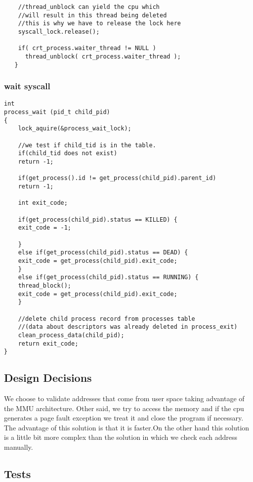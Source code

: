 {\begin{lstlisting}
    //thread_unblock can yield the cpu which
    //will result in this thread being deleted
    //this is why we have to release the lock here
    syscall_lock.release();
    
    if( crt_process.waiter_thread != NULL ) 
      thread_unblock( crt_process.waiter_thread );
   }
    \end{lstlisting}


    \subsubsection{wait syscall}
    \vspace{-1em} %
    \begin{lstlisting}
int
process_wait (pid_t child_pid) 
{
    lock_aquire(&process_wait_lock);
    
    //we test if child_tid is in the table.
    if(child_tid does not exist) 
	return -1;

    if(get_process().id != get_process(child_pid).parent_id)
	return -1;

    int exit_code;

    if(get_process(child_pid).status == KILLED) {
	exit_code = -1;
	
    }
    else if(get_process(child_pid).status == DEAD) {
	exit_code = get_process(child_pid).exit_code;            
    }
    else if(get_process(child_pid).status == RUNNING) {
	thread_block(); 
	exit_code = get_process(child_pid).exit_code;
    }

    //delete child process record from processes table 
    //(data about descriptors was already deleted in process_exit)
    clean_process_data(child_pid);
    return exit_code;
}
    \end{lstlisting}


    \subsection{Design Decisions}

	We choose to validate addresses that come from user space taking advantage of the MMU architecture. Other said, we try to access the memory and if the cpu generates a page fault exception we treat it and close the program if necessary. The advantage of this solution is that it is faster.On the other hand this solution is a little bit more complex than the solution in which we check each address manually.

    \subsection{Tests}

}
